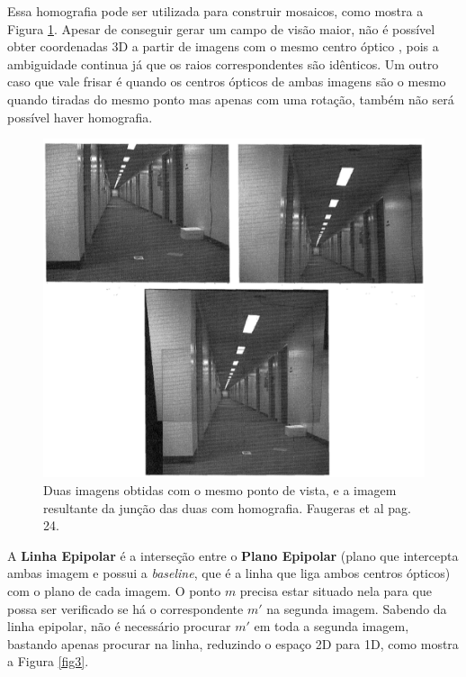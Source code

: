 Essa homografia pode ser utilizada para construir mosaicos, como mostra a Figura \ref{fig2}. Apesar de conseguir gerar um campo de visão maior, não é possível obter coordenadas 3D a partir de imagens com o mesmo centro óptico \cite{Faugeras-Geometry}, pois a ambiguidade continua já que os raios correspondentes são idênticos. Um outro caso que vale frisar é quando os centros ópticos de ambas imagens são o mesmo quando tiradas do mesmo ponto mas apenas com uma rotação, também não será possível haver homografia.

\begin{figure}[H]
	\centering
		\includegraphics[width=1.0\textwidth]{Imagens/figura2-2.png}
	\caption{Duas imagens obtidas com o mesmo ponto de vista, e a imagem resultante da junção das duas com homografia. Faugeras et al \cite{Faugeras-Geometry} pag. 24.}
	\label{fig2}
\end{figure}

A \textbf{Linha Epipolar} é a interseção entre o \textbf{Plano Epipolar} (plano que intercepta ambas imagem e possui a \textit{baseline}, que é a linha que liga ambos centros ópticos) com o plano de cada imagem. O ponto $m$ precisa estar situado nela para que possa ser verificado se há o correspondente $m'$ na segunda imagem. Sabendo da linha epipolar, não é necessário procurar $m'$ em toda a segunda imagem, bastando apenas procurar na linha, reduzindo o espaço 2D para 1D, como mostra a Figura \ref{fig3}.

